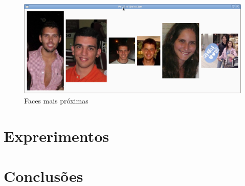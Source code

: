\documentclass[10pt,a4paper]{article}
\begin{document}
\begin{center}
\begin{figure}[h!]
\includegraphics[scale=0.5]{6maisproximos}
\caption{Faces mais próximas}
\end{figure}
\end{center}

\section{Exprerimentos}

\section{Conclusões}


\begin{small}
  
\end{small}
\end{document}

